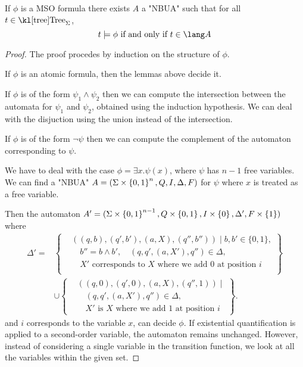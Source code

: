 \documentclass{article}
\begin{document}
\begin{lemma} \label{lem:MSO-aut}
	If $\phi$ is a MSO formula there exists $A$ a "NBUA" such that for all $t \in \tree_{\Sigma}$,
	\[ t \models \phi \tiff t \in \lang A \]
\end{lemma}


\begin{proof}
	The proof procedes by induction on the structure of $\phi$.

	If $\phi$ is an atomic formula, then the lemmas above decide it.

	If $\phi$ is of the form $\psi_1 \land \psi_2$ then we can compute the intersection between the automata
	for $\psi_1$ and $\psi_2$, obtained using the induction hypothesis. We can deal with the disjuction using the
	union instead of the intersection.

	If $\phi$ is of the form $\lnot \psi$ then we can compute the complement of the automaton corresponding to $\psi$.

	We have to deal with the case $\phi = \exists x.\psi(x)$, where $\psi$ has $n-1$ free variables. We can find a "NBUA" $A = (\Sigma \times \left\{0,1\right\}^n, Q, I, \Delta, F)$
	for $\psi$ where $x$ is treated as a free variable.

	Then the automaton $A' = (\Sigma \times \left\{0,1\right\}^{n-1}, Q \times \left\{0,1\right\}, I \times \left\{0\right\}, \Delta', F \times \left\{1\right\})$ where
	\[
		\begin{aligned}
			\Delta' = & \left\{
			\begin{aligned}
				 & ((q,b), (q', b'), (a, X), (q'',b'')) \mid b, b' \in \{0,1\},               \\
				 & \quad b'' = b \land b', \quad (q, q', (a, X'), q'') \in \Delta,            \\
				 & \quad X' \text{ corresponds to $X$ where we add } 0 \text{ at position } i \\
			\end{aligned}
			\right\}                 \\
			          & \cup \left\{
			\begin{aligned}
				 & ((q,0), (q', 0), (a, X), (q'',1)) \mid                         \\
				 & \quad (q, q', (a, X'), q'') \in \Delta,                        \\
				 & \quad X' \text{ is $X$ where we add } 1 \text{ at position } i
			\end{aligned}
			\right\}.
		\end{aligned}
	\]
	and $i$ corresponds to the variable $x$, can decide $\phi$. If existential quantification is applied to a
	second-order variable, the automaton remains unchanged. However, instead of considering a single variable
	in the transition function, we look at all the variables within the given set.
\end{proof}
\end{document}
